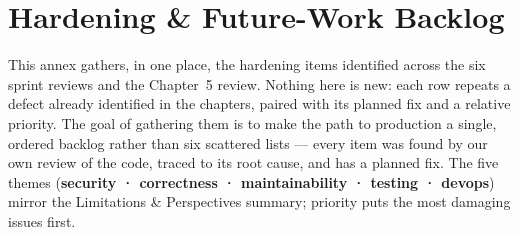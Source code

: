 \appendix
\chapter{Hardening \& Future-Work Backlog}

This annex gathers, in one place, the hardening items identified across the six sprint reviews and the
Chapter~5 review. Nothing here is new: each row repeats a defect already identified in
the chapters, paired with its planned fix and a relative priority. The goal of gathering
them is to make the path to production a single, ordered backlog rather than six scattered lists --- every item
was found by our own review of the code, traced to its root cause, and has a planned fix. The
five themes (\textbf{security · correctness · maintainability · testing · devops}) mirror the Limitations \&
Perspectives summary; priority puts the most damaging issues first.

